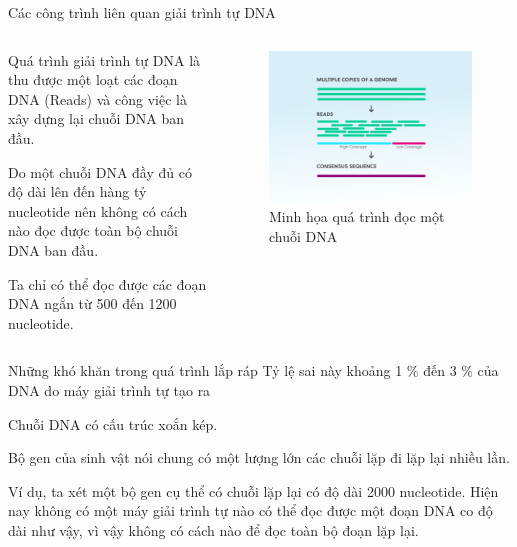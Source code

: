 \documentclass[10pt]{beamer}
\theoremstyle{remark}
\numberwithin{algocf}{section}
\numberwithin{equation}{section}
\numberwithin{dl}{section}
\numberwithin{figure}{section}
\begin{document}
\begin{frame}{Các công trình liên quan giải trình tự DNA}

    \begin{columns}
        \begin{column}{0.47\textwidth}
            Quá trình giải trình tự DNA là thu được một loạt các đoạn DNA (Reads) và công việc là xây dựng lại chuỗi DNA ban đầu.

            Do một chuỗi DNA đầy đủ có độ dài lên đến hàng tỷ nucleotide nên không có cách nào đọc được toàn bộ chuỗi DNA ban đầu.

            Ta chỉ có thể đọc được các đoạn DNA ngắn từ 500 đến 1200 nucleotide.
        \end{column}
        \begin{column}{0.47\textwidth}
            \begin{figure}[h!]
                \centering
                \includegraphics[height=0.75\textheight]{figures/dna_reads_example.png}
                \caption{Minh họa quá trình đọc một chuỗi DNA}
            \end{figure}
        \end{column}
    \end{columns}
    
\end{frame}

\begin{frame}{Những khó khăn trong quá trình lắp ráp}
    Tỷ lệ sai này khoảng 1 \% đến 3 \% của DNA do máy giải trình tự tạo ra

    Chuỗi DNA có cấu trúc xoắn kép.

    Bộ gen của sinh vật nói chung có một lượng lớn các chuỗi lặp đi lặp lại nhiều lần.

    Ví dụ, ta xét một bộ gen cụ thể có chuỗi lặp lại có độ dài 2000 nucleotide. Hiện nay không có một máy giải trình tự nào có thể đọc được một đoạn DNA co độ dài như vậy, vì vậy không có cách nào để đọc toàn bộ đoạn lặp lại.

\end{frame}
\end{document}
